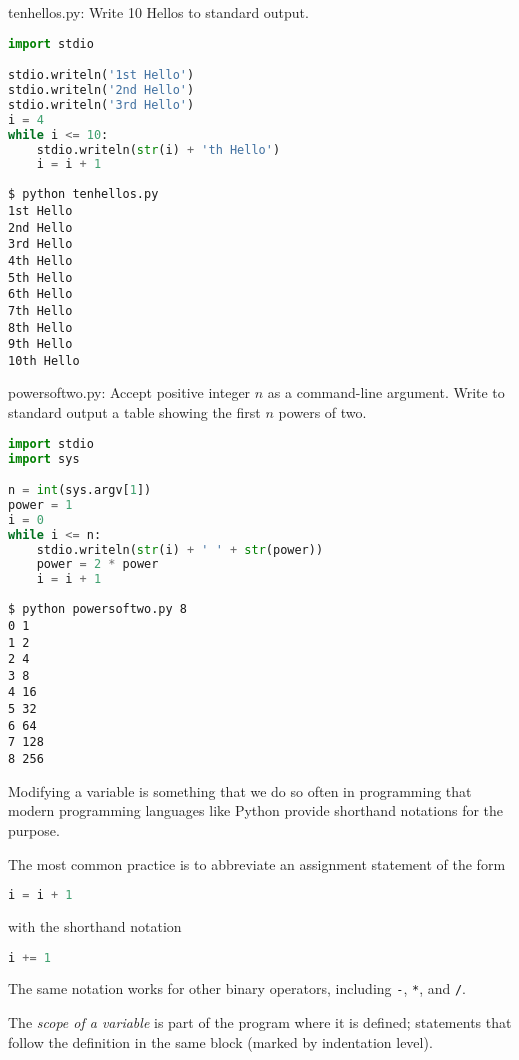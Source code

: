 \documentclass[8pt,a4paper,compress,handout]{beamer}
\begin{document}
\begin{frame}[fragile]
\begin{framed}
\tiny tenhellos.py: Write 10 Hellos to standard output.
\end{framed}

\begin{lstlisting}[language=Python]
import stdio

stdio.writeln('1st Hello')
stdio.writeln('2nd Hello')
stdio.writeln('3rd Hello')
i = 4
while i <= 10:
    stdio.writeln(str(i) + 'th Hello')
    i = i + 1
\end{lstlisting}

\begin{lstlisting}[language={}]
$ python tenhellos.py 
1st Hello
2nd Hello
3rd Hello
4th Hello
5th Hello
6th Hello
7th Hello
8th Hello
9th Hello
10th Hello
\end{lstlisting}
\end{frame}

\begin{frame}[fragile]
\begin{framed}
\tiny powersoftwo.py: Accept positive integer $n$ as a command-line argument. Write to standard output a table showing the first $n$ powers of two.
\end{framed}

\begin{lstlisting}[language=Python]
import stdio
import sys

n = int(sys.argv[1])
power = 1
i = 0
while i <= n:
    stdio.writeln(str(i) + ' ' + str(power))    
    power = 2 * power
    i = i + 1
\end{lstlisting}

\begin{lstlisting}[language={}]
$ python powersoftwo.py 8
0 1
1 2
2 4
3 8
4 16
5 32
6 64
7 128
8 256
\end{lstlisting}
\end{frame}

\begin{frame}[fragile]
Modifying a variable is something that we do so often in programming that modern programming languages like Python provide shorthand notations for the purpose.

\bigskip

The most common practice is to abbreviate an assignment statement of the form 

\begin{lstlisting}[language=Python]
i = i + 1
\end{lstlisting}

with the shorthand notation

\begin{lstlisting}[language=Python]
i += 1
\end{lstlisting}

\bigskip

The same notation works for other binary operators, including \lstinline{-}, \lstinline{*}, and \lstinline{/}.

\bigskip

The \emph{scope of a variable} is part of the program where it is defined; statements that follow the definition in the same block (marked by indentation level).
\end{frame}
\end{document}
